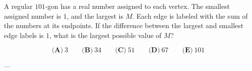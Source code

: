 A regular \(101\)-gon has a real number assigned to each vertex. The smallest assigned number is \(1\), and the largest is \(M\). Each edge is labeled with the sum of the numbers at its endpoints. If the difference between the largest and smallest edge labels is \(1\), what is the largest possible value of \(M\)?



\[
\textbf{(A)}\ 3
\qquad
\textbf{(B)}\ 34
\qquad
\textbf{(C)}\ 51
\qquad
\textbf{(D)}\ 67
\qquad
\textbf{(E)}\ 101
\]

---
